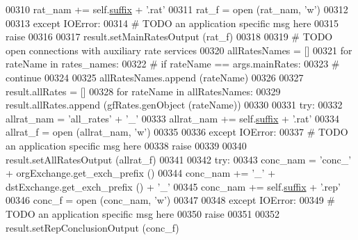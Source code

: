 \begin{DoxyCode}
{00310             rat\_nam +=  self.\hyperlink{classe2e_1_1_application_a4d824ad36b051d2d629edb314385df0d}{suffix} + \textcolor{stringliteral}{'.rat'}
00311             rat\_f = open (rat\_nam, \textcolor{stringliteral}{'w'})
00312             
00313         \textcolor{keywordflow}{except} IOError:
00314             \textcolor{comment}{# TODO an application specific msg here}
00315             \textcolor{keywordflow}{raise}        
00316 
00317         result.setMainRatesOutput (rat\_f)
00318             
00319         \textcolor{comment}{# TODO open connections with auxiliary rate services}
00320         allRatesNames = []        
00321         \textcolor{keywordflow}{for} rateName \textcolor{keywordflow}{in} rates\_names:
00322 \textcolor{comment}{#            if rateName == args.mainRates:}
00323 \textcolor{comment}{#                continue }
00324             
00325             allRatesNames.append (rateName)
00326 
00327         result.allRates = []            
00328         \textcolor{keywordflow}{for} rateName \textcolor{keywordflow}{in} allRatesNames:
00329             result.allRates.append (gfRates.genObject (rateName))
00330             
00331         \textcolor{keywordflow}{try}:
00332             allrat\_nam  =  \textcolor{stringliteral}{'all\_rates'} + \textcolor{stringliteral}{'\_'}
00333             allrat\_nam +=  self.\hyperlink{classe2e_1_1_application_a4d824ad36b051d2d629edb314385df0d}{suffix} + \textcolor{stringliteral}{'.rat'}
00334             allrat\_f = open (allrat\_nam, \textcolor{stringliteral}{'w'})
00335             
00336         \textcolor{keywordflow}{except} IOError:
00337             \textcolor{comment}{# TODO an application specific msg here}
00338             \textcolor{keywordflow}{raise}        
00339 
00340         result.setAllRatesOutput (allrat\_f)
00341             
00342         \textcolor{keywordflow}{try}:
00343             conc\_nam  = \textcolor{stringliteral}{'conc\_'} + orgExchange.get\_exch\_prefix ()
00344             conc\_nam += \textcolor{stringliteral}{'\_'} + dstExchange.get\_exch\_prefix () + \textcolor{stringliteral}{'\_'} 
00345             conc\_nam += self.\hyperlink{classe2e_1_1_application_a4d824ad36b051d2d629edb314385df0d}{suffix} + \textcolor{stringliteral}{'.rep'}
00346             conc\_f    = open (conc\_nam, \textcolor{stringliteral}{'w'})
00347             
00348         \textcolor{keywordflow}{except} IOError:
00349             \textcolor{comment}{# TODO an application specific msg here}
00350             \textcolor{keywordflow}{raise}        
00351 
00352         result.setRepConclusionOutput (conc\_f)
}
\end{DoxyCode}
